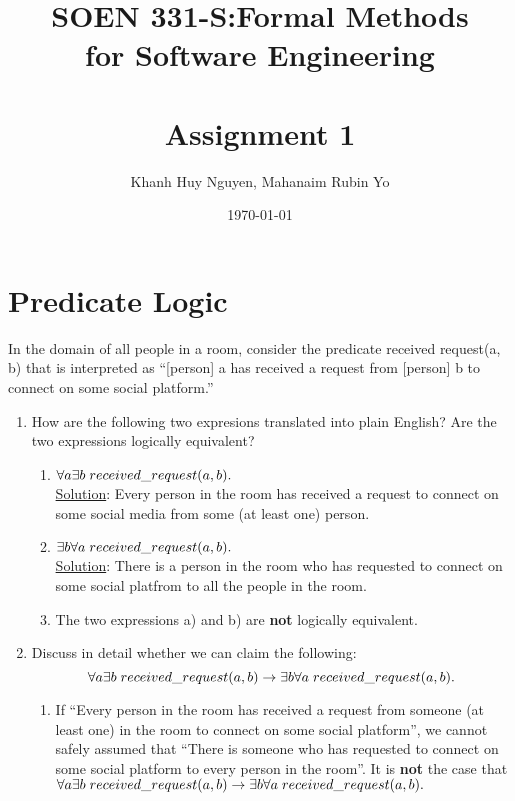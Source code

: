 \documentclass[12pt]{article}
\title{SOEN 331-S:Formal Methods\\for Software Engineering\\
\ \\
Assignment 1}
\author{Khanh Huy Nguyen, Mahanaim Rubin Yo}
\date{\today}
\begin{document}
\maketitle



\newpage
\section{Predicate Logic}


\noindent In the domain of all people in a room, consider the predicate received request(a, b) that is
interpreted as ``[person] a has received a request from [person] b to connect on some social platform.''
\begin{enumerate}
      \item How are the following two expresions translated into plain English? Are the two expressions logically equivalent?
            \begin{enumerate} [label=\alph*)]
                  \item \( \forall a \exists b \hspace{1mm} received\_request(a,b). \)\\
                        \noindent \underline{Solution}: Every person in the room has received a request to connect on some social media from some (at least one) person.
                  \item \(\exists b \forall a \hspace{1mm} received\_request(a,b).\)\\
                        \noindent \underline{Solution}: There is a person in the room who has requested to connect on some social platfrom to all the people in the room.
                  \item The two expressions a) and b) are {\bf not} logically equivalent.
            \end{enumerate}

      \item Discuss in detail whether we can claim the following:
            \[\forall a \exists b \hspace{1mm} received\_request(a,b) \rightarrow \exists b \forall a \hspace{1mm} received\_request(a,b).\]
            \begin{enumerate} [label=\roman*)]
                  \item If ``Every person in the room has received a request from someone (at least one) in the room to connect on some social platform'',
                        \noindent we cannot safely assumed that ``There is someone who has requested to connect on some social platform to every person in the room''.
                        \noindent It is {\bf not} the case that \(\forall a \exists b \hspace{1mm} received\_request(a,b) \rightarrow \exists b \forall a \hspace{1mm} received\_request(a,b).\)


\end{enumerate}
\end{enumerate}
\end{document}
